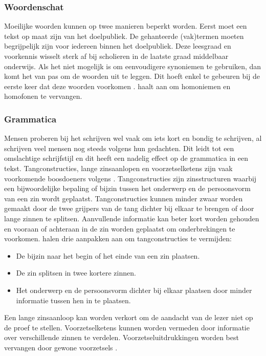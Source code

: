 \subsubsection{Woordenschat}

Moeilijke woorden kunnen op twee manieren beperkt worden. Eerst moet een tekst op maat zijn van het doelpubliek. De gehanteerde (vak)termen moeten begrijpelijk zijn voor iedereen binnen het doelpubliek. Deze leesgraad en voorkennis wisselt sterk af bij scholieren in de laatste graad middelbaar onderwijs. Als het niet mogelijk is om eenvoudigere synoniemen te gebruiken, dan komt het van pas om de woorden uit te leggen. Dit hoeft enkel te gebeuren bij de eerste keer dat deze woorden voorkomen \autocite{Bosmans2022a, Bosmans2022b}. \textcite{Case2008} haalt aan om homoniemen en homofonen te vervangen. %

\subsubsection{Grammatica}

Mensen proberen bij het schrijven wel vaak om iets kort en bondig te schrijven, al schrijven veel mensen nog steeds volgens hun gedachten. Dit leidt tot een omslachtige schrijfstijl en dit heeft een nadelig effect op de grammatica in een tekst. Tangconstructies, lange zinsaanlopen en voorzetselketens zijn vaak voorkomende boosdoeners volgens \textcite{Bosmans2022c}. Tangconstructies zijn zinsstructuren waarbij een bijwoordelijke bepaling of bijzin tussen het onderwerp en de persoonsvorm van een zin wordt geplaatst. Tangconstructies kunnen minder zwaar worden gemaakt door de twee grijpers van de tang dichter bij elkaar te brengen of door lange zinnen te splitsen. Aanvullende informatie kan beter kort worden gehouden en vooraan of achteraan in de zin worden geplaatst om onderbrekingen te voorkomen. \textcite{Rijnvis2020, Bosmans2022c} halen drie aanpakken aan om tangconstructies te vermijden:

\begin{itemize}
	\item De bijzin naar het begin of het einde van een zin plaatsen.
	\item De zin splitsen in twee kortere zinnen.
	\item Het onderwerp en de persoonsvorm dichter bij elkaar plaatsen door minder informatie tussen hen in te plaatsen.
\end{itemize}

Een lange zinsaanloop kan worden verkort om de aandacht van de lezer niet op de proef te stellen. Voorzetselketens kunnen worden vermeden door informatie over verschillende zinnen te verdelen. Voorzetseluitdrukkingen worden best vervangen door gewone voorzetsels \autocite{Bosmans2022c}.


